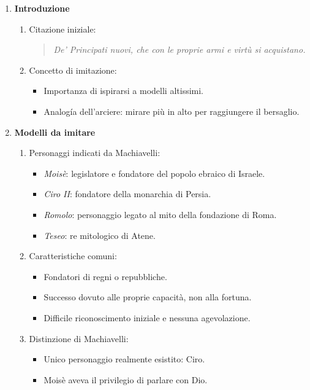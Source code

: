 \documentclass{article}
\begin{document}
\begin{enumerate}
    \item \textbf{Introduzione}
    \begin{enumerate}[label*=\arabic*.]
        \item Citazione iniziale:
        \begin{quote}
            \itshape
            De' Principati nuovi, che con le proprie armi e virtù si acquistano.
        \end{quote}
        \item Concetto di imitazione:
        \begin{itemize}
            \item Importanza di ispirarsi a modelli altissimi.
            \item Analogía dell'arciere: mirare più in alto per raggiungere il bersaglio.
        \end{itemize}
    \end{enumerate}

    \item \textbf{Modelli da imitare}
    \begin{enumerate}[label*=\arabic*.]
        \item Personaggi indicati da Machiavelli:
        \begin{itemize}
            \item \textit{Moisè}: legislatore e fondatore del popolo ebraico di Israele.
            \item \textit{Ciro II}: fondatore della monarchia di Persia.
            \item \textit{Romolo}: personaggio legato al mito della fondazione di Roma.
            \item \textit{Teseo}: re mitologico di Atene.
        \end{itemize}
        \item Caratteristiche comuni:
        \begin{itemize}
            \item Fondatori di regni o repubbliche.
            \item Successo dovuto alle proprie capacità, non alla fortuna.
            \item Difficile riconoscimento iniziale e nessuna agevolazione.
        \end{itemize}
        \item Distinzione di Machiavelli:
        \begin{itemize}
            \item Unico personaggio realmente esistito: Ciro.
            \item Moisè aveva il privilegio di parlare con Dio.
        \end{itemize}
    \end{enumerate}


\end{enumerate}
\end{document}
